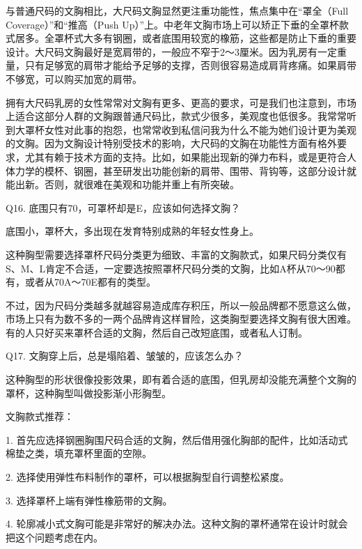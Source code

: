 \documentclass[12pt,UTF8]{ctexbook}
\begin{document}
与普通尺码的文胸相比，大尺码文胸显然更注重功能性，焦点集中在“罩全（Full Coverage）”和“推高（Push Up）”上。中老年文胸市场上可以矫正下垂的全罩杯款式居多。全罩杯式大多有钢圈，或者底围用较宽的橡筋，这些都是防止下垂的重要设计。大尺码文胸最好是宽肩带的，一般应不窄于2～3厘米。因为乳房有一定重量，只有足够宽的肩带才能给予足够的支撑，否则很容易造成肩背疼痛。如果肩带不够宽，可以购买加宽的肩带。



拥有大尺码乳房的女性常常对文胸有更多、更高的要求，可是我们也注意到，市场上适合这部分人群的文胸跟普通尺码比，款式少很多，美观度也低很多。我常常听到大罩杯女性对此事的抱怨，也常常收到私信问我为什么不能为她们设计更为美观的文胸。因为文胸设计特别受技术的影响，大尺码的文胸在功能性方面有格外要求，尤其有赖于技术方面的支持。比如，如果能出现新的弹力布料，或是更符合人体力学的模杯、钢圈，甚至研发出功能创新的肩带、围带、背钩等，这部分设计就能出新。否则，就很难在美观和功能并重上有所突破。





Q16. 底围只有70，可罩杯却是E，应该如何选择文胸？


底围小，罩杯大，多出现在发育特别成熟的年轻女性身上。

这种胸型需要选择罩杯尺码分类更为细致、丰富的文胸款式，如果尺码分类仅有S、M、L肯定不合适，一定要选按照罩杯尺码分类的文胸，比如A杯从70～90都有，或者从70A～70E都有的类型。

不过，因为尺码分类越多就越容易造成库存积压，所以一般品牌都不愿意这么做，市场上只有为数不多的一两个品牌肯这样冒险，这类胸型要选择文胸有很大困难。有的人只好买来罩杯合适的文胸，然后自己改短底围，或者私人订制。





Q17. 文胸穿上后，总是塌陷着、皱皱的，应该怎么办？


这种胸型的形状很像投影效果，即有着合适的底围，但乳房却没能充满整个文胸的罩杯，这种胸型叫做投影渐小形胸型。


文胸款式推荐：

1. 首先应选择钢圈胸围尺码合适的文胸，然后借用强化胸部的配件，比如活动式棉垫之类，填充罩杯里面的空隙。

2. 选择使用弹性布料制作的罩杯，可以根据胸型自行调整松紧度。

3. 选择罩杯上端有弹性橡筋带的文胸。

4. 轮廓减小式文胸可能是非常好的解决办法。这种文胸的罩杯通常在设计时就会把这个问题考虑在内。
\end{document}
